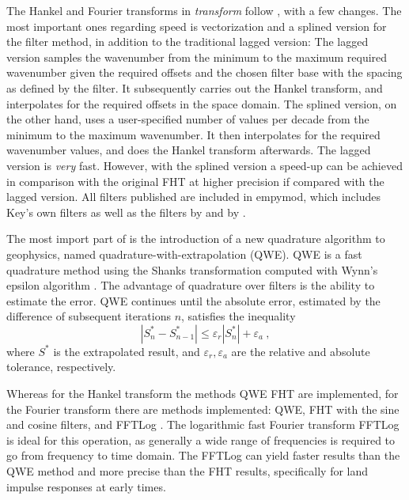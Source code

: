 \documentclass[manuscript,revised]{geophysics}
\begin{document}
The  Hankel and Fourier transforms in \emph{transform}
follow \cite{GEO.12.Key}, with a few changes. The most important
ones regarding speed is vectorization and a
splined version for the filter method, in addition to the traditional lagged
version: The lagged version samples the wavenumber from the minimum to the
maximum required wavenumber given the required offsets and the chosen filter
base with the spacing as defined by the filter. It subsequently carries out the
Hankel transform, and interpolates for the required offsets in the space
domain. The splined version, on the other hand, uses a user-specified number of
values per decade from the minimum to the maximum wavenumber. It then
interpolates for the required wavenumber values, and does the Hankel transform
afterwards. The lagged version is \emph{very} fast. However, with the splined
version a speed-up can be achieved in comparison with the original FHT at
higher precision if compared with the lagged version. All filters published
 \cite{GEO.09.Key,
GEO.12.Key} are included in empymod, which includes Key's own filters as well
as the filters by \cite{TMS.82.Anderson} and by \cite{GP.07.Kong}.  

The most import part of  is the introduction of a
new quadrature algorithm to geophysics, named
qua\-dra\-ture-with-ex\-tra\-po\-la\-tion (QWE). QWE is a fast quadrature
method using the Shanks transformation \citep{JMP.55.Shanks} computed with
Wynn's epsilon algorithm \citep{MC.56.Wynn}. The advantage of quadrature over
filters is the ability to estimate the error. QWE continues until the absolute
error, estimated by the difference of subsequent iterations $n$, satisfies the
inequality
%
\begin{equation}
  |S^*_n-S^*_{n-1}| \le \varepsilon_r|S^*_n| + \varepsilon_a\ ,
  \label{eq:err}
\end{equation}
%
where $S^*$ is the extrapolated result, and $\varepsilon_r, \varepsilon_a$ are
the relative and absolute tolerance, respectively.

Whereas for the Hankel transform the  methods QWE\new{,}
 FHT are implemented, for the Fourier transform there
are  methods implemented: QWE, FHT with the sine and
cosine filters,  and FFTLog \citep{RAS.00.Hamilton}.
The logarithmic fast Fourier transform FFTLog is ideal for this operation, as
generally a wide range of frequencies is required to go from 
frequency to  time domain. The FFTLog can yield faster results than
the QWE method and more precise than the FHT results, specifically for land
impulse responses at early times.
\end{document}
